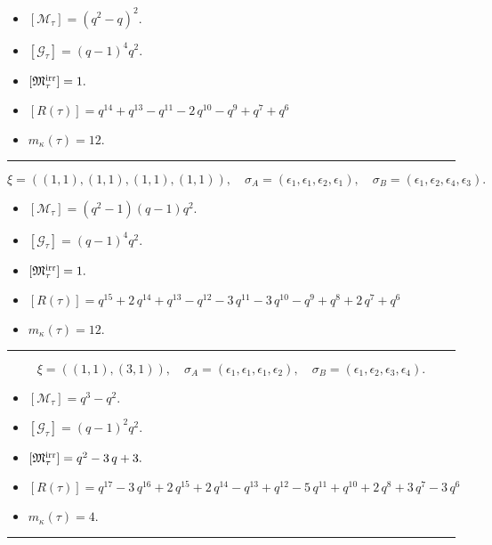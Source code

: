 \documentclass[10pt,a4paper]{amsart}
\begin{document}
\begin{itemize}
 \item $[\mathcal{M}_{\tau}] = {\left(q^{2} - q\right)}^{2} .$

 \item $[\mathcal{G}_{\tau}] = {\left(q - 1\right)}^{4} q^{2} .$

 \item $[{\frak M}_{\tau}^{\textrm{irr}}] = 1 .$

 \item $[R(\tau)] = q^{14} + q^{13} - q^{11} - 2 \, q^{10} - q^{9} + q^{7} + q^{6} $

 \item $m_{\kappa}(\tau) = 12 .$

 \end{itemize}
\noindent\rule{8cm}{0.4pt}

$$\xi = ({(1, 1), (1, 1)}, {(1, 1)}, {(1, 1)}),\quad \sigma_A = ({{\epsilon_1}, {\epsilon_1}}, {{\epsilon_2}}, {{\epsilon_1}}),\quad \sigma_B = ({{\epsilon_1}, {\epsilon_2}}, {{\epsilon_4}}, {{\epsilon_3}}).$$

\begin{itemize}
 \item $[\mathcal{M}_{\tau}] = {\left(q^{2} - 1\right)} {\left(q - 1\right)} q^{2} .$

 \item $[\mathcal{G}_{\tau}] = {\left(q - 1\right)}^{4} q^{2} .$

 \item $[{\frak M}_{\tau}^{\textrm{irr}}] = 1 .$

 \item $[R(\tau)] = q^{15} + 2 \, q^{14} + q^{13} - q^{12} - 3 \, q^{11} - 3 \, q^{10} - q^{9} + q^{8} + 2 \, q^{7} + q^{6} $

 \item $m_{\kappa}(\tau) = 12 .$

 \end{itemize}
\noindent\rule{8cm}{0.4pt}

$$\xi = ({(1, 1)}, {(3, 1)}),\quad \sigma_A = ({{\epsilon_1}}, {{\epsilon_1, \epsilon_1, \epsilon_2}}),\quad \sigma_B = ({{\epsilon_1}}, {{\epsilon_2, \epsilon_3, \epsilon_4}}).$$

\begin{itemize}
 \item $[\mathcal{M}_{\tau}] = q^{3} - q^{2} .$

 \item $[\mathcal{G}_{\tau}] = {\left(q - 1\right)}^{2} q^{2} .$

 \item $[{\frak M}_{\tau}^{\textrm{irr}}] = q^{2} - 3 \, q + 3 .$

 \item $[R(\tau)] = q^{17} - 3 \, q^{16} + 2 \, q^{15} + 2 \, q^{14} - q^{13} + q^{12} - 5 \, q^{11} + q^{10} + 2 \, q^{8} + 3 \, q^{7} - 3 \, q^{6} $

 \item $m_{\kappa}(\tau) = 4 .$

 \end{itemize}
\noindent\rule{8cm}{0.4pt}
\end{document}
